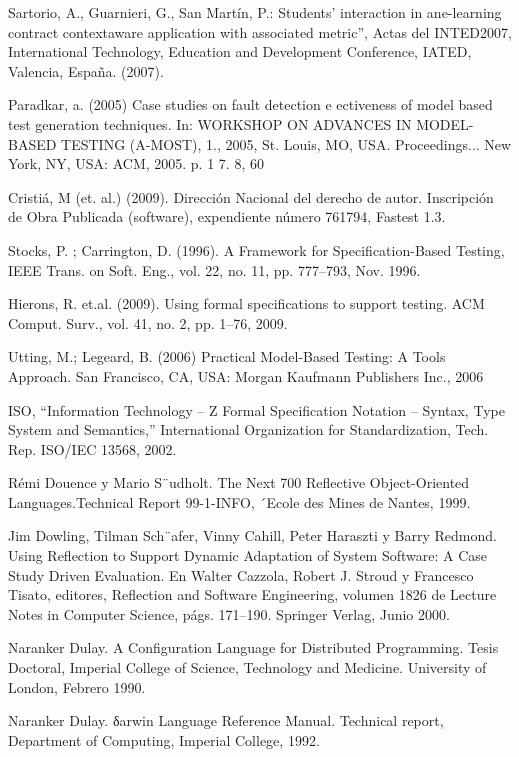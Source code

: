\begin{thebibliography}{1}
{\bibitem{}
Sartorio, A., Guarnieri, G., San Martín, P.: Students’ interaction in
ane-learning contract contextaware application with associated metric”, Actas
del INTED2007, International Technology, Education and Development Conference,
IATED, Valencia, España. (2007).

\bibitem{}
Paradkar, a. (2005) Case studies on fault detection e ectiveness of model
based test generation techniques. In: WORKSHOP ON ADVANCES IN MODEL-BASED
TESTING (A-MOST), 1., 2005, St. Louis, MO, USA. Proceedings... New York, NY,
USA: ACM, 2005. p. 1 7. 8, 60

\bibitem{}
Cristiá, M (et. al.) (2009). Dirección Nacional del derecho de autor.
Inscripción de Obra Publicada (software), expendiente número 761794, Fastest
1.3.

\bibitem{}
Stocks, P. ;  Carrington, D. (1996). A Framework for Specification-Based
Testing, IEEE Trans. on Soft. Eng., vol. 22, no. 11, pp. 777–793, Nov. 1996.


\bibitem{}
Hierons,  R. et.al. (2009). Using formal specifications to support
testing.  ACM Comput. Surv., vol. 41, no. 2, pp. 1–76, 2009.

\bibitem{}
Utting, M.;  Legeard, B. (2006) Practical Model-Based Testing: A Tools
Approach.  San Francisco, CA, USA: Morgan Kaufmann Publishers Inc., 2006

\bibitem{}
ISO, “Information Technology – Z Formal Specification Notation – Syntax, Type
System and Semantics,” International Organization for Standardization,  Tech.
Rep. ISO/IEC 13568, 2002.


\bibitem{}
Rémi Douence y Mario S¨udholt. The Next 700 Reflective Object-Oriented
Languages.Technical Report 99-1-INFO, ´Ecole des Mines de Nantes, 1999.

\bibitem{}
Jim Dowling, Tilman Sch¨afer, Vinny Cahill, Peter Haraszti y Barry
Redmond. Using Reflection to Support Dynamic Adaptation of System Software: A
Case Study Driven Evaluation. En Walter Cazzola, Robert J. Stroud y Francesco
Tisato, editores, Reflection and Software Engineering, volumen 1826 de Lecture
Notes in Computer Science, págs. 171–190. Springer Verlag, Junio 2000.

\bibitem{}
Naranker Dulay. A Configuration Language for Distributed Programming.
Tesis Doctoral, Imperial College of Science, Technology and Medicine. University
of London, Febrero 1990.

\bibitem{}
Naranker Dulay. δarwin Language Reference Manual. Technical report,
Department of Computing, Imperial College, 1992.


}
\end{thebibliography}
